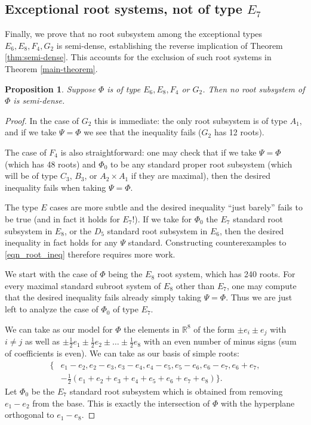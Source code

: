 \documentclass[12pt]{amsart}
\newtheorem{prop}[theorem]{Proposition}
\theoremstyle{remark}
\begin{document}
\subsection{Exceptional root systems, not of type $E_7$}
Finally, we prove that no root subsystem among the exceptional types $E_6, E_8, F_4, G_2$ is semi-dense, establishing the reverse implication of Theorem \ref{thm:semi-dense}. This accounts for the exclusion of such root systems in Theorem \ref{main-theorem}. 

\begin{prop}\label{lemma:exceptional-small}
    Suppose $\Phi$ is of type $E_6, E_8, F_4$ or $G_2$. Then no root subsystem of $\Phi$ is semi-dense.
\end{prop}
\begin{proof}
    In the case of $G_2$ this is immediate: the only root subsystem is of type $A_1$, and if we take $\Psi= \Phi$ we see that the inequality fails ($G_2$ has 12 roots). 

    The case of $F_4$ is also straightforward: one may check that if we take $\Psi =\Phi$ (which has 48 roots) and $\Phi_0$ to be any standard proper root subsystem (which will be of type $C_3$, $B_3$, or $A_2\times A_1$ if they are maximal), then the desired inequality fails when taking $\Psi=\Phi$. 

    The type $E$ cases are more subtle and the desired inequality ``just barely'' fails to be true (and in fact it holds for $E_7$!). If we take for $\Phi_0$ the $E_7$ standard root subsystem in $E_8$, or the $D_5$ standard root subsystem in $E_6$, then the desired inequality in fact holds for any $\Psi$ standard. Constructing counterexamples to \eqref{eqn_root_ineq} therefore requires more work.

    We start with the case of $\Phi$ being the $E_8$ root system, which has 240 roots. For every maximal standard subroot system of $E_8$ other than $E_7$, one may compute that the desired inequality fails already simply taking $\Psi = \Phi$. Thus we are just left to analyze the case of $\Phi_0$ of type $E_7$.
    
    We can take as our model for $\Phi$ the elements in $\mathbb{R}^8$ of the form $\pm e_i \pm e_j$ with $i \neq j$ as well as $\pm \frac{1}{2} e_1 \pm \frac{1}{2} e_2 \pm \dots \pm \frac{1}{2} e_8$ with an even number of minus signs (sum of coefficients is even). We can take as our basis of simple roots: 
\begin{align*}
    \{& e_1 - e_2, e_2 - e_3, e_3 - e_4, e_4 - e_5, e_5 - e_6, e_6 - e_7, e_6 + e_7, \\
    &-\frac{1}{2}(e_1 + e_2 + e_3 + e_4 + e_5 + e_6 + e_7 + e_8)\}.
\end{align*}
     Let $\Phi_0$ be the $E_7$ standard root subsystem which is obtained from removing $e_1 - e_2$ from the base. This is exactly the intersection of $\Phi$ with the hyperplane orthogonal to $e_1 - e_8$. 


\end{proof}
\end{document}
